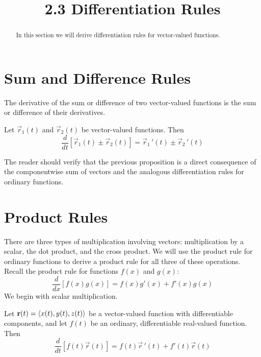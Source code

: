\documentclass[handout]{ximera}
\title{2.3 Differentiation Rules}
\begin{document}
\begin{abstract}
In this section we will derive differentiation rules for vector-valued functions.
\end{abstract}

\maketitle

\section{Sum and Difference Rules}


The derivative of the sum or difference of two vector-valued functions is the sum or difference of their derivatives.

\begin{proposition}
Let $\vec r_1(t)$ and $\vec r_2(t)$ be vector-valued functions. Then
\[
\frac{d}{dt}\left[\vec r_1(t) \pm \vec r_2(t) \right] = \vec r_1\,'(t) \pm \vec r_2\,'(t)
\]
\end{proposition}
The reader should verify that the previous proposition is a direct consequence of the 
componentwise sum of vectors and the analogous differentiation rules for ordinary functions.

\section{Product Rules}
There are three types of multiplication involving vectors: multiplication by a scalar, the dot product, and the cross product.
We will use the product rule for ordinary functions to derive a product rule for all three of these operations.
Recall the product rule for functions $f(x)$ and $g(x)$:
\[
\frac{d}{dx}\left[f(x)g(x)\right] = f(x)g'(x) + f'(x)g(x)
\]
We begin with scalar multiplication.

\begin{proposition}
Let $\mathbf r(t) = \left\langle x(t), y(t),z(t)\right\rangle$ be a vector-valued function with differentiable components, and let $f(t)$ be an ordinary, differentiable real-valued function.
Then
\[
\frac{d}{dt}\left[f(t)\vec r(t)\right] = f(t)\vec r\,'(t) + f'(t)\vec r(t)
\]
\end{proposition}
\end{document}
